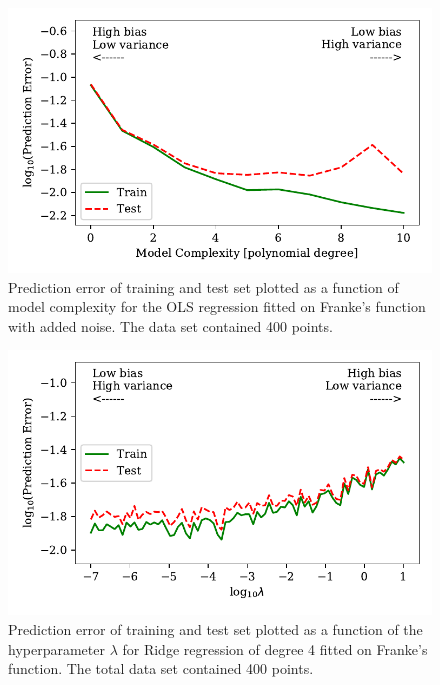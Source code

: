 \documentclass[a4paper, 10pt]{article}
\begin{document}
\begin{figure}[H]
    \includegraphics[scale=1]{figs/biasvariancetradeoff_ols_Franke.pdf}
    \caption{Prediction error of training and test set plotted as a function of model complexity for the OLS regression fitted on Franke's function with added noise. The data set contained 400 points.}
    \label{fig:bias_ols_Franke}
\end{figure}

\begin{figure}[H]
    \includegraphics{figs/biasvariancetradeoff_Ridge_Franke.pdf}
    \caption{Prediction error of training and test set plotted as a function of the hyperparameter $\lambda$ for Ridge regression of degree 4 fitted on Franke's function. The total data set contained 400 points.}
    \label{fig:bias_ridge_Franke}
\end{figure}
\end{document}
